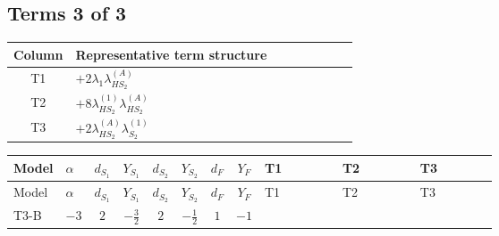 \documentclass[8pt]{article}
\begin{document}
\begin{landscape}
\subsection*{Terms 3 of 3}
\begin{center}
\begin{tabular}{@{}c >{\raggedright\arraybackslash}p{0.82\linewidth}@{}}
\toprule
Column & Representative term structure \\
\midrule
T1 & \(\displaystyle +2 {\lambda_1} {\lambda_{HS_2}^{(A)}}\) \\
\midrule
T2 & \(\displaystyle +8 {\lambda_{HS_2}^{(1)}} {\lambda_{HS_2}^{(A)}}\) \\
\midrule
T3 & \(\displaystyle +2 {\lambda_{HS_2}^{(A)}} {\lambda_{S_2}^{(1)}}\) \\
\midrule
\bottomrule
\end{tabular}
\end{center}
\smallskip
\tiny
\begin{longtable}{@{}llcccccc >{\raggedright\arraybackslash}p{0.21\linewidth} >{\raggedright\arraybackslash}p{0.21\linewidth} >{\raggedright\arraybackslash}p{0.21\linewidth}@{}}
\toprule
Model & $\alpha$ & $d_{S_1}$ & $Y_{S_1}$ & $d_{S_2}$ & $Y_{S_2}$ & $d_F$ & $Y_F$ & T1 & T2 & T3 \\
\midrule
\endfirsthead
\toprule
Model & $\alpha$ & $d_{S_1}$ & $Y_{S_1}$ & $d_{S_2}$ & $Y_{S_2}$ & $d_F$ & $Y_F$ & T1 & T2 & T3 \\
\midrule
\endhead
T3-B & $-3$ & $2$ & $-\frac{3}{2}$ & $2$ & $-\frac{1}{2}$ & $1$ & $-1$ & \scriptsize\adjustbox{max width=\linewidth}{$\begin{gathered} +2 {\lambda_1} {\lambda_{HS_2}^{(A)}}\end{gathered}$} & \scriptsize\adjustbox{max width=\linewidth}{$\begin{gathered} +8 {\lambda_{HS_2}^{(1)}} {\lambda_{HS_2}^{(A)}}\end{gathered}$} & \scriptsize\adjustbox{max width=\linewidth}{$\begin{gathered} +2 {\lambda_{HS_2}^{(A)}} {\lambda_{S_2}^{(1)}}\end{gathered}$} \\
\midrule
\bottomrule
\end{longtable}
\end{landscape}
\end{document}
